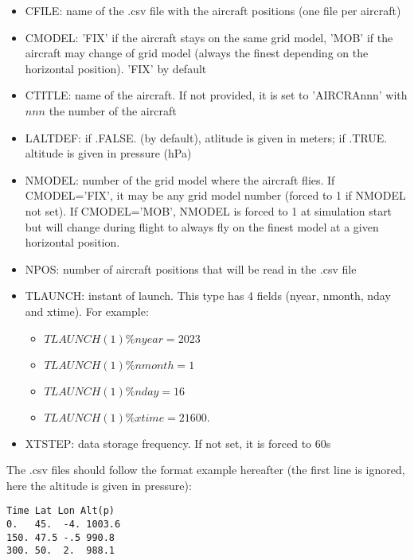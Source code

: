 \begin{itemize}
\item CFILE: name of the .csv file with the aircraft positions (one file per aircraft)

\item CMODEL: 'FIX' if the aircraft stays on the same grid model, 'MOB' if the aircraft may change of grid model (always the finest depending on the horizontal position). 'FIX' by default

\item CTITLE: name of the aircraft. If not provided, it is set to 'AIRCRAnnn' with $nnn$ the number of the aircraft

\item LALTDEF: if .FALSE. (by default), atlitude is given in meters; if .TRUE. altitude is given in pressure (hPa)

\item NMODEL: number of the grid model where the aircraft flies. If CMODEL='FIX', it may be any grid model number (forced to 1 if NMODEL not set). If CMODEL='MOB', NMODEL is forced to 1 at simulation start but will change during flight to always fly on the finest model at a given horizontal position.

\item NPOS: number of aircraft positions that will be read in the .csv file

\item TLAUNCH: instant of launch. This type has 4 fields (nyear, nmonth, nday and xtime). For example:
  \begin{itemize}
    \item $TLAUNCH(1)\%nyear  =  2023$
    \item $TLAUNCH(1)\%nmonth =     1$
    \item $TLAUNCH(1)\%nday   =    16$
    \item $TLAUNCH(1)\%xtime  = 21600.$
  \end{itemize}

\item XTSTEP: data storage frequency. If not set, it is forced to 60s

\end{itemize}

The .csv files should follow the format example hereafter (the first line is ignored, here the altitude is given in pressure):
\begin{verbatim}
Time Lat Lon Alt(p)
0.   45.  -4. 1003.6
150. 47.5 -.5 990.8
300. 50.  2.  988.1
\end{verbatim}

